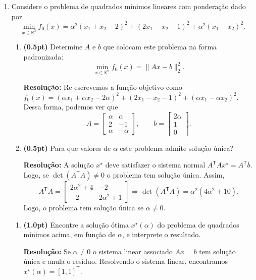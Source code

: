 \documentclass{article}
\newcommand{\R}{\mathbb{R}}
\newcommand{\T}{\mathsf{T}}
\begin{document}
\begin{enumerate}[label=$\blacktriangleright$ {\bf Questão \arabic*:},series=exerc,align=left]
\pagebreak

\item Considere o problema de quadrados mínimos lineares com ponderação dado por
\[
\min_{x \in \R^3}  f_0(x) = \alpha^2(x_1 + x_2 - 2)^2 + (2x_1 - x_2 - 1)^2 + \alpha^2(x_1 - x_2)^2.
\]
\begin{enumerate}[label=(\alph*),series=q2]
\item {\bf (0.5pt)} Determine $A$ e $b$ que colocam este problema na forma padronizada:
\[
\min_{x \in \R^n} f_0(x) = \|Ax - b\|_2^2.
\]
\begin{framed}
{\bf Resolução:}
Re-escrevemos a função objetivo como $f_0(x) = (\alpha x_1 + \alpha x_2 - 2\alpha)^2 + (2x_1 - x_2 - 1)^2 + (\alpha x_1 - \alpha x_2)^2$. Dessa forma, podemos ver que
\begin{equation*}
    A = 
    \begin{bmatrix}
    \alpha & \alpha\\
    2 & -1\\
    \alpha & -\alpha
    \end{bmatrix},\qquad
    b = 
    \begin{bmatrix}
    2\alpha \\  1\\ 0
    \end{bmatrix}.
\end{equation*}
\end{framed}

\item {\bf (0.5pt)} Para que valores de $\alpha$ este problema admite solução única?

\begin{framed}
{\bf Resolução:}
A solução $x^\star$ deve satisfazer o sistema normal $A^\T A x^\star = A^\T b$. Logo, se $\det(A^\T A) \neq 0$ o problema tem solução única. Assim,
\[
    A^\T A = 
    \begin{bmatrix}
        2\alpha^2+4 & -2 \\
        -2 & 2\alpha^2 + 1
    \end{bmatrix}
    \Rightarrow 
    \det(A^\T A) = \alpha^2(4\alpha^2 + 10).
\]
Logo, o problema tem solução única se $\alpha \neq 0$.
\end{framed}
\end{enumerate}

\begin{enumerate}[resume*=q2]
\item {\bf (1.0pt)} Encontre a solução ótima $x^\star(\alpha)$ do problema de quadrados mínimos acima, em função de $\alpha$, e interprete o resultado.
\begin{framed}
{\bf Resolução:}
Se $\alpha\neq 0$ o sistema linear associado $Ax=b$ tem solução única e anula o resíduo. Resolvendo o sistema linear, encontramos $x^\star(\alpha)=[1,1]^\T$.


\end{framed}
\end{enumerate}
\end{enumerate}
\end{document}
